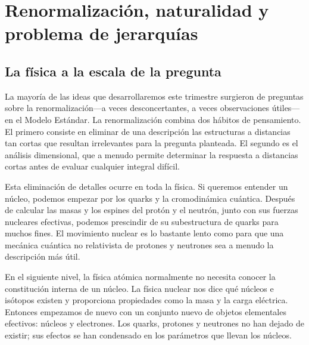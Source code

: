 \chapter{Renormalización, naturalidad y problema de jerarquías}


\section{La física a la escala de la pregunta}

La mayoría de las ideas que desarrollaremos este trimestre surgieron de preguntas sobre la renormalización---a veces desconcertantes, a veces observaciones útiles---en el Modelo Estándar. La renormalización combina dos hábitos de pensamiento. El primero consiste en eliminar de una descripción las estructuras a distancias tan cortas que resultan irrelevantes para la pregunta planteada. El segundo es el análisis dimensional, que a menudo permite determinar la respuesta a distancias cortas antes de evaluar cualquier integral difícil.

Esta eliminación de detalles ocurre en toda la física. Si queremos entender un núcleo, podemos empezar por los quarks y la cromodinámica cuántica. Después de calcular las masas y los espines del protón y el neutrón, junto con sus fuerzas nucleares efectivas, podemos prescindir de su subestructura de quarks para muchos fines. El movimiento nuclear es lo bastante lento como para que una mecánica cuántica no relativista de protones y neutrones sea a menudo la descripción más útil.

En el siguiente nivel, la física atómica normalmente no necesita conocer la constitución interna de un núcleo. La física nuclear nos dice qué núcleos e isótopos existen y proporciona propiedades como la masa y la carga eléctrica. Entonces empezamos de nuevo con un conjunto nuevo de objetos elementales efectivos: núcleos y electrones. Los quarks, protones y neutrones no han dejado de existir; sus efectos se han condensado en los parámetros que llevan los núcleos.

